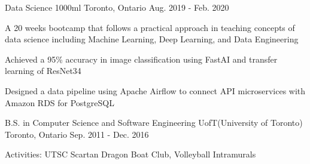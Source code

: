 

\begin{cventries}

    \cventry
    { Data Science} %
    {1000ml} %
    {Toronto, Ontario} %
    {Aug. 2019 - Feb. 2020} %
    {
      \begin{cvitems} %
        \item {A 20 weeks bootcamp that follows a practical approach in teaching concepts of data science including Machine Learning, Deep Learning, and Data Engineering}
        \item {Achieved a 95\% accuracy in image classification using FastAI and transfer learning of ResNet34}
        \item {Designed a data pipeline using Apache Airflow to connect API microservices with Amazon RDS for PostgreSQL}
      \end{cvitems}
    }

  \cventry
    {B.S. in Computer Science and Software Engineering} %
    {UofT(University of Toronto)} %
    {Toronto, Ontario} %
    {Sep. 2011 - Dec. 2016} %
    {
      \begin{cvitems} %
        {Activities: UTSC Scartan Dragon Boat Club, Volleyball Intramurals}
      \end{cvitems}
    }

\end{cventries}

